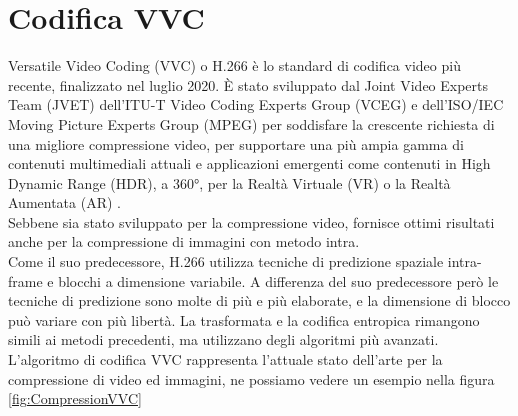\section{Codifica VVC}
Versatile Video Coding (VVC) o H.266 è lo standard di codifica video più recente, finalizzato nel luglio 2020. È stato sviluppato dal Joint Video Experts Team (JVET) dell'ITU-T Video Coding Experts Group (VCEG) e dell'ISO/IEC Moving Picture Experts Group (MPEG) per soddisfare la crescente richiesta di una migliore compressione video, per supportare una più ampia gamma di contenuti multimediali attuali e applicazioni emergenti come contenuti in High Dynamic Range (HDR), a 360°, per la Realtà Virtuale (VR) o la Realtà Aumentata (AR) \cite{9503377}.\\
Sebbene sia stato sviluppato per la compressione video, fornisce ottimi risultati anche per la compressione di immagini con metodo intra.\\
Come il suo predecessore, H.266 utilizza tecniche di predizione spaziale intra-frame e blocchi a dimensione variabile. A differenza del suo predecessore però le tecniche di predizione sono molte di più e più elaborate, e la dimensione di blocco può variare con più libertà.
La trasformata e la codifica entropica rimangono simili ai metodi precedenti, ma utilizzano degli algoritmi più avanzati.\\
L’algoritmo di codifica VVC rappresenta l’attuale stato dell’arte per la compressione di video ed immagini, ne possiamo vedere un esempio nella figura \ref{fig:CompressionVVC}\\
\newpage

